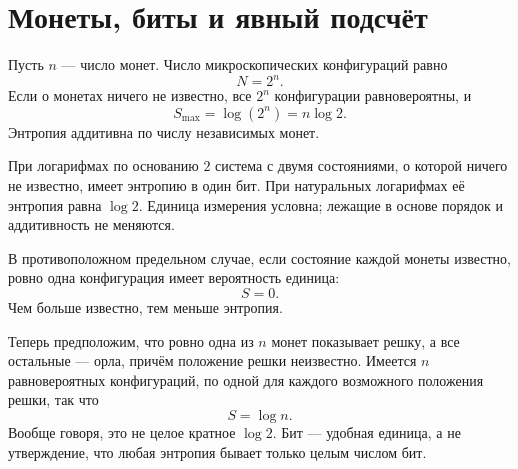 \section{Монеты, биты и явный подсчёт}

Пусть \(n\) — число монет. Число микроскопических конфигураций равно
\begin{equation}
 N=2^n.
 \label{eq:sm1-coin-state-count}
\end{equation}
Если о монетах ничего не известно, все \(2^n\) конфигурации равновероятны, и
\begin{equation}
 S_{\max}=\log(2^n)=n\log2.
 \label{eq:sm1-coin-max-entropy}
\end{equation}
Энтропия аддитивна по числу независимых монет.

При логарифмах по основанию \(2\) система с двумя состояниями, о которой ничего не известно, имеет энтропию в один бит. При натуральных логарифмах её энтропия равна \(\log2\). Единица измерения условна; лежащие в основе порядок и аддитивность не меняются.

В противоположном предельном случае, если состояние каждой монеты известно, ровно одна конфигурация имеет вероятность единица:
\begin{equation}
 S=0.
\end{equation}
Чем больше известно, тем меньше энтропия.

Теперь предположим, что ровно одна из \(n\) монет показывает решку, а все остальные — орла, причём положение решки неизвестно. Имеется \(n\) равновероятных конфигураций, по одной для каждого возможного положения решки, так что
\begin{equation}
 S=\log n.
 \label{eq:sm1-one-tail-entropy}
\end{equation}
Вообще говоря, это не целое кратное \(\log2\). Бит — удобная единица, а не утверждение, что любая энтропия бывает только целым числом бит.

\begin{classroomqa}
\end{classroomqa}

